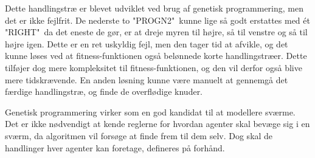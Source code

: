 Dette handlingstræ er blevet udviklet ved brug af genetisk programmering, men det er ikke fejlfrit. De nederste to "PROGN2"\ kunne lige så godt erstattes med ét "RIGHT"\, da det eneste de gør, er at dreje myren til højre, så til venstre og så til højre igen. Dette er en ret uskyldig fejl, men den tager tid at afvikle, og det kunne løses ved at fitness-funktionen også belønnede korte handlingstræer. Dette tilføjer dog mere kompleksitet til fitness-funktionen, og den vil derfor også blive mere tidskrævende. En anden løsning kunne være manuelt at gennemgå det færdige handlingstræ, og finde de overflødige knuder.
\par
{}
\par
Genetisk programmering virker som en god kandidat til at modellere sværme. Det er ikke nødvendigt at kende reglerne for hvordan agenter skal bevæge sig i en sværm, da algoritmen vil forsøge at finde frem til dem selv. Dog skal de handlinger hver agenter kan foretage, defineres på forhånd.


